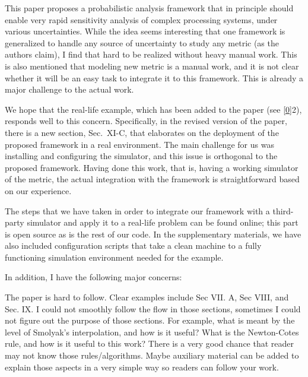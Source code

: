 \begin{reviewer}
This paper proposes a probabilistic analysis framework that in principle should
enable very rapid sensitivity analysis of complex processing systems, under
various uncertainties. While the idea seems interesting that one framework is
generalized to handle any source of uncertainty to study any metric (as the
authors claim), I find that hard to be realized without heavy manual work. This
is also mentioned that modeling new metric is a manual work, and it is not clear
whether it will be an easy task to integrate it to this framework. This is
already a major challenge to the actual work.
\end{reviewer}

\begin{authors}
We hope that the real-life example, which has been added to the paper (see
\cref{0}{2}), responds well to this concern. Specifically, in the revised
version of the paper, there is a new section, Sec.~XI-C, that elaborates on the
deployment of the proposed framework in a real environment. The main challenge
for us was installing and configuring the simulator, and this issue is
orthogonal to the proposed framework. Having done this work, that is, having a
working simulator of the metric, the actual integration with the framework is
straightforward based on our experience.

The steps that we have taken in order to integrate our framework with a
third-party simulator and apply it to a real-life problem can be found online;
this part is open source as is the rest of our code. In the supplementary
materials, we have also included configuration scripts that take a clean machine
to a fully functioning simulation environment needed for the example.

\begin{actions}
\end{actions}
\end{authors}

\begin{reviewer}
In addition, I have the following major concerns:

The paper is hard to follow. Clear examples include Sec VII. A, Sec VIII, and
Sec. IX. I could not smoothly follow the flow in those sections, sometimes I
could not figure out the purpose of those sections. For example, what is meant
by the level of Smolyak's interpolation, and how is it useful? What is the
Newton-Cotes rule, and how is it useful to this work? There is a very good
chance that reader may not know those rules/algorithms. Maybe auxiliary material
can be added to explain those aspects in a very simple way so readers can follow
your work.
\end{reviewer}


